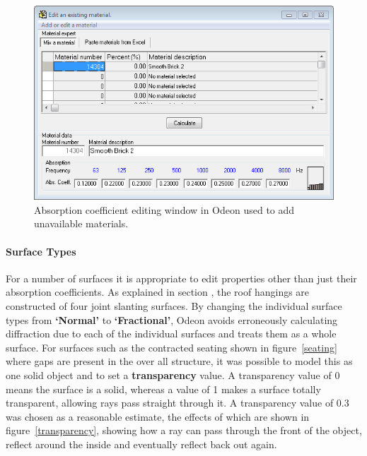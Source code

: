 \documentclass[../../main.tex]{subfiles}
\begin{document}
			\begin{figure}[H]
				\centerline{\includegraphics[scale = 0.9]{Sections/Implementation/Odeon/images/Absorption.PNG}}
				\caption{Absorption coefficient editing window in Odeon used to add unavailable materials.}
				\label{materialEdit}
			\end{figure}

		\paragraph{Surface Types}

			For a number of surfaces it is appropriate to edit properties other than just their absorption coefficients. As explained in section , the roof hangings are constructed of four joint slanting surfaces. By changing the individual surface types from \textbf{`Normal'} to \textbf{`Fractional'}, Odeon avoids erroneously calculating diffraction due to each of the individual surfaces and treats them as a whole surface. For surfaces such as the contracted seating shown in figure~\ref{seating} where gaps are present in the over all structure, it was possible to model this as one solid object and to set a \textbf{transparency} value. A transparency value of 0 means the surface is a solid, whereas a value of 1 makes a surface totally transparent, allowing rays pass straight through it. A transparency value of 0.3 was chosen as a reasonable estimate, the effects of which are shown in figure~\ref{transparency}, showing how a ray can pass through the front of the object, reflect around the inside and eventually reflect back out again.
\end{document}

